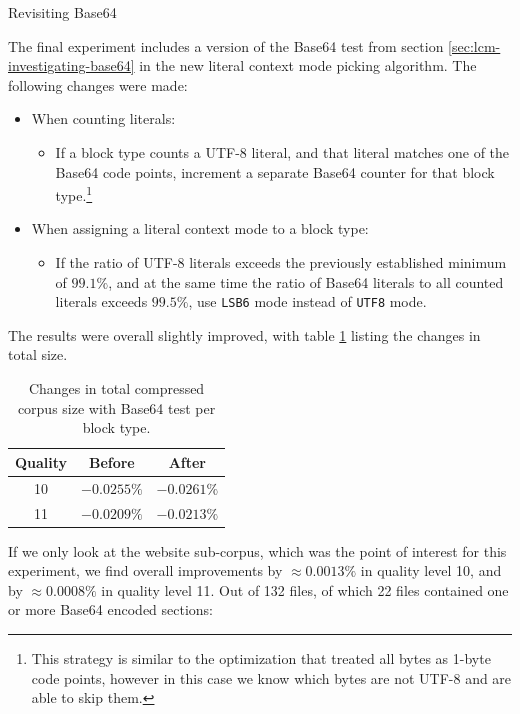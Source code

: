 \documentclass[english,master,dept460,male,cpp,cpdeclaration]{diploma}
\makeatletter
\renewcommand\paragraph
	{\@startsection{paragraph}{4}{\z@}
	{-3.25ex plus 1ex minus .2ex}
	{1.5ex plus .2ex}
	{\normalfont\normalsize\bfseries}}
\newcommand{\subfoursection}[1]{\paragraph{#1}}
\newcommand{\nosep}{\itemsep0em}
\makeatother
\begin{document}
			\subfoursection{Revisiting Base64}
			
			The final experiment includes a version of the Base64 test from section \ref{sec:lcm-investigating-base64} in the new literal context mode picking algorithm. The following changes were made:
			
			\begin{itemize} \nosep
				\item When counting literals:
					\begin{itemize} \nosep
						\item If a block type counts a UTF-8 literal, and that literal matches one of the Base64 code points, increment a separate Base64 counter for that block type.\footnote{This strategy is similar to the optimization that treated all bytes as 1-byte code points, however in this case we know which bytes are not UTF-8 and are able to skip them.}
					\end{itemize}
				\item When assigning a literal context mode to a block type:
					\begin{itemize} \nosep
						\item If the ratio of UTF-8 literals exceeds the previously established minimum of $99.1 \%$, and at the same time the ratio of Base64 literals to all counted literals exceeds $99.5 \%$, use \verb|LSB6| mode instead of \verb|UTF8| mode.
					\end{itemize}
			\end{itemize}
			
			\noindent
			The results were overall slightly improved, with table \ref{table:multi-lcm-base64-results} listing the changes in total size.
			
			\begin{table}[H]
				\centering
				\caption{Changes in total compressed corpus size with Base64 test per block type.}
				\label{table:multi-lcm-base64-results}
				\begin{tabular}{c|c|c}
					Quality &    Before    &    After     \\ \hline
					  10    & $-0.0255 \%$ & $-0.0261 \%$ \\
					  11    & $-0.0209 \%$ & $-0.0213 \%$
				\end{tabular}
			\end{table}
			
			\noindent
			If we only look at the website sub-corpus, which was the point of interest for this experiment, we find overall improvements by $\approx 0.0013 \%$ in quality level 10, and by $\approx 0.0008 \%$ in quality level 11. Out of 132 files, of which 22 files contained one or more Base64 encoded sections:
			
\end{document}
